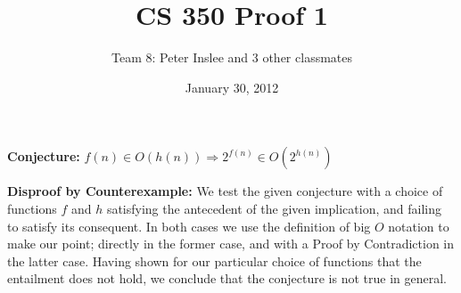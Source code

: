 \documentclass{article}
\begin{document}
\title{CS 350 Proof 1}
\author{Team 8: Peter Inslee and 3 other classmates}
\date{January 30, 2012}
\maketitle

\parindent 0pt
\parskip 5pt

\textbf{Conjecture:} $f(n) \in O(h(n)) \Rightarrow 2^{f(n)} \in O(2^{h(n)})$

\textbf{Disproof by Counterexample:}
We test the given conjecture with a choice of functions $f$ and $h$ satisfying the antecedent of the given implication, and failing to satisfy its consequent. In both cases we use the definition of big $O$ notation to make our point; directly in the former case, and with a Proof by Contradiction in the latter case. Having shown for our particular choice of functions that the entailment does not hold, we conclude that the conjecture is not true in general.
\end{document}
